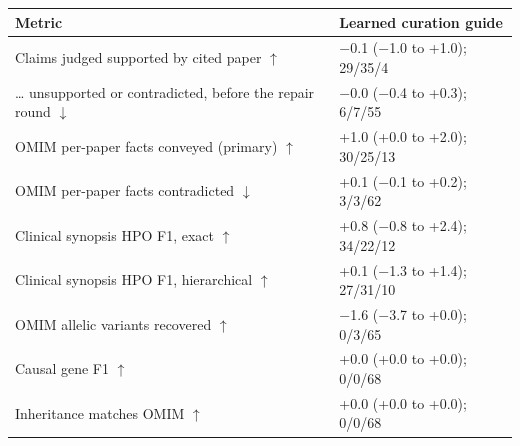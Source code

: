 \documentclass{article} %
\begin{document}
\begin{table}[!htb]
\begin{tabularx}{\linewidth}{>{\raggedright\arraybackslash}p{5.6cm}>{\centering\arraybackslash}X}
\toprule
Metric & Learned curation guide \\
\midrule
Claims judged supported by cited paper $\uparrow$ & $-$0.1 ($-$1.0 to +1.0); 29/35/4 \\
\ldots{} unsupported or contradicted, before the repair round $\downarrow$ & $-$0.0 ($-$0.4 to +0.3); 6/7/55 \\
OMIM per-paper facts conveyed (primary) $\uparrow$ & +1.0 (+0.0 to +2.0); 30/25/13 \\
OMIM per-paper facts contradicted $\downarrow$ & +0.1 ($-$0.1 to +0.2); 3/3/62 \\
Clinical synopsis HPO F1, exact $\uparrow$ & +0.8 ($-$0.8 to +2.4); 34/22/12 \\
Clinical synopsis HPO F1, hierarchical $\uparrow$ & +0.1 ($-$1.3 to +1.4); 27/31/10 \\
OMIM allelic variants recovered $\uparrow$ & $-$1.6 ($-$3.7 to +0.0); 0/3/65 \\
Causal gene F1 $\uparrow$ & +0.0 (+0.0 to +0.0); 0/0/68 \\
Inheritance matches OMIM $\uparrow$ & +0.0 (+0.0 to +0.0); 0/0/68 \\
\bottomrule
\end{tabularx}
\end{table}

\FloatBarrier
\FloatBarrier
\end{document}

